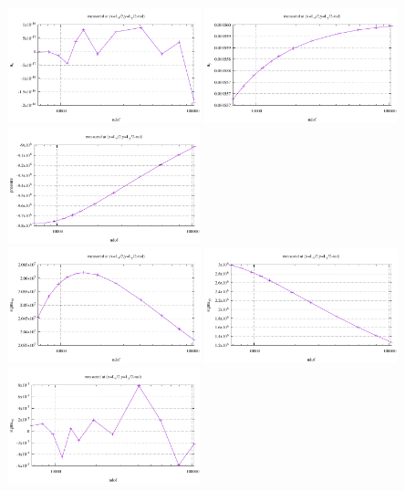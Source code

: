 \begin{center}
\includegraphics[width=5.6cm]{python_codes/fieldstone_124/results/exp1/south_ux}
\includegraphics[width=5.6cm]{python_codes/fieldstone_124/results/exp1/south_uy}
\includegraphics[width=5.6cm]{python_codes/fieldstone_124/results/exp1/south_p}\\
\includegraphics[width=5.6cm]{python_codes/fieldstone_124/results/exp1/south_sigmaxx}
\includegraphics[width=5.6cm]{python_codes/fieldstone_124/results/exp1/south_sigmayy}
\includegraphics[width=5.6cm]{python_codes/fieldstone_124/results/exp1/south_sigmaxy}
\end{center}






